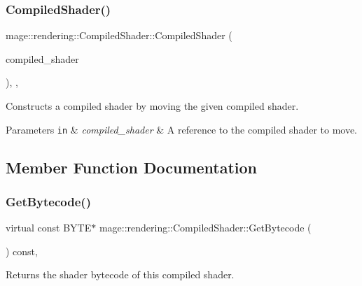\subsubsection{\texorpdfstring{Compiled\+Shader()}{CompiledShader()}\hspace{0.1cm}{\footnotesize\ttfamily [3/3]}}
{\footnotesize\ttfamily mage\+::rendering\+::\+Compiled\+Shader\+::\+Compiled\+Shader (\begin{DoxyParamCaption}\item[{\hyperlink{classmage_1_1rendering_1_1_compiled_shader}{Compiled\+Shader} \&\&}]{compiled\+\_\+shader }\end{DoxyParamCaption})\hspace{0.3cm}{\ttfamily [protected]}, {\ttfamily [default]}, {\ttfamily [noexcept]}}

Constructs a compiled shader by moving the given compiled shader.


\begin{DoxyParams}[1]{Parameters}
\mbox{\tt in}  & {\em compiled\+\_\+shader} & A reference to the compiled shader to move. \\
\hline
\end{DoxyParams}


\subsection{Member Function Documentation}
\hypertarget{classmage_1_1rendering_1_1_compiled_shader_a6067250341f428be19ed2aa9955a10b6}{}\label{classmage_1_1rendering_1_1_compiled_shader_a6067250341f428be19ed2aa9955a10b6} 
\subsubsection{\texorpdfstring{Get\+Bytecode()}{GetBytecode()}}
{\footnotesize\ttfamily virtual const B\+Y\+TE$\ast$ mage\+::rendering\+::\+Compiled\+Shader\+::\+Get\+Bytecode (\begin{DoxyParamCaption}{ }\end{DoxyParamCaption}) const\hspace{0.3cm}{\ttfamily [pure virtual]}, {\ttfamily [noexcept]}}

Returns the shader bytecode of this compiled shader.

